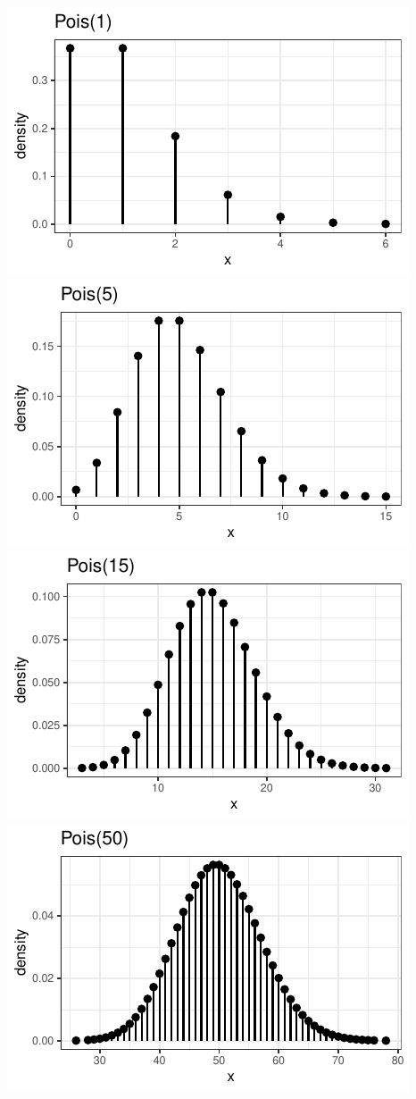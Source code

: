 \documentclass[twoside]{book}\usepackage[]{graphicx}\usepackage[]{xcolor}
\makeatletter
\def\maxwidth{ %
  \ifdim\Gin@nat@width>\linewidth
    \linewidth
  \else
    \Gin@nat@width
  \fi
}
\newenvironment{knitrout}{}{} %
\makeatother
\begin{document}
\begin{knitrout}
{\centering \includegraphics[width=\maxwidth]{figures/fig-unnamed-chunk-93-1} 
\includegraphics[width=\maxwidth]{figures/fig-unnamed-chunk-93-2} 
\includegraphics[width=\maxwidth]{figures/fig-unnamed-chunk-93-3} 
\includegraphics[width=\maxwidth]{figures/fig-unnamed-chunk-93-4} 

}
\end{knitrout}
\end{document}
